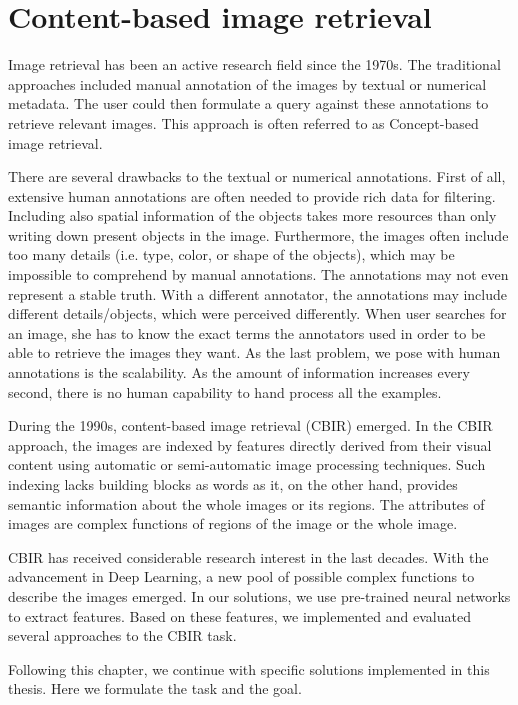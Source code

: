 \chapter{Content-based image retrieval}

Image retrieval has been an active research field since the 1970s. The traditional approaches included manual annotation of the images by textual or numerical metadata. The user could then formulate a query against these annotations to retrieve relevant images. This approach is often referred to as Concept-based image retrieval.

There are several drawbacks to the textual or numerical annotations. First of all, extensive human annotations are often needed to provide rich data for filtering. Including also spatial information of the objects takes more resources than only writing down present objects in the image. Furthermore, the images often include too many details (i.e. type, color, or shape of the objects), which may be impossible to comprehend by manual annotations.  The annotations may not even represent a stable truth. With a different annotator, the annotations may include different details/objects, which were perceived differently. When user searches for an image, she has to know the exact terms the annotators used in order to be able to retrieve the images they want. As the last problem, we pose with human annotations is the scalability. As the amount of information increases every second, there is no human capability to hand process all the examples.

During the 1990s, content-based image retrieval (CBIR) emerged. In the CBIR approach, the images are indexed by features directly derived from their visual content using automatic or semi-automatic image processing techniques. Such indexing lacks building blocks as words as it, on the other hand, provides semantic information about the whole images or its regions. The attributes of images are complex functions of regions of the image or the whole image.

CBIR has received considerable research interest in the last decades. With the advancement in Deep Learning, a new pool of possible complex functions to describe the images emerged. In our solutions, we use pre-trained neural networks to extract features. Based on these features, we implemented and evaluated several approaches to the CBIR task.

Following this chapter, we continue with specific solutions implemented in this thesis. Here we formulate the task and the goal.

